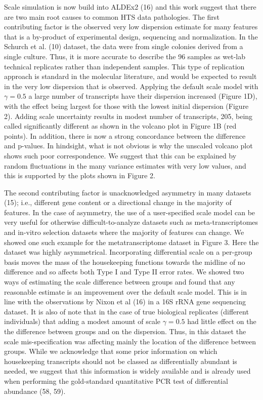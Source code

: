 \documentclass[
]{article}
\begin{document}
Scale simulation is now build into ALDEx2 (16) and this work suggest
that there are two main root causes to common HTS data pathologies. The
first contributing factor is the observed very low dispersion estimate
for many features that is a by-product of experimental design,
sequencing and normalization. In the Schurch et al. (10) dataset, the
data were from single colonies derived from a single culture. Thus, it
is more accurate to describe the 96 samples as wet-lab technical
replicates rather than independent samples. This type of replication
approach is standard in the molecular literature, and would be expected
to result in the very low dispersion that is observed. Applying the
default scale model with \(\gamma=0.5\) a large number of transcripts
have their dispersion increased (Figure 1D), with the effect being
largest for those with the lowest initial dispersion (Figure 2). Adding
scale uncertainty results in modest number of transcripts, 205, being
called significantly different as shown in the volcano plot in Figure 1B
(red points). In addition, there is now a strong concordance between the
difference and p-values. In hindsight, what is not obvious is why the
unscaled volcano plot shows such poor correspondence. We suggest that
this can be explained by random fluctuations in the many variance
estimates with very low values, and this is supported by the plots shown
in Figure 2.

The second contributing factor is unacknowledged asymmetry in many
datasets (15); i.e., different gene content or a directional change in
the majority of features. In the case of asymmetry, the use of a
user-specified scale model can be very useful for otherwise
difficult-to-analyze datasets such as meta-transcriptomes and in-vitro
selection datasets where the majority of features can change. We showed
one such example for the metatranscriptome dataset in Figure 3. Here the
dataset was highly asymmetrical. Incorporating differential scale on a
per-group basis moves the mass of the housekeeping functions towards the
midline of no difference and so affects both Type I and Type II error
rates. We showed two ways of estimating the scale difference between
groups and found that any reasonable estimate is an improvement over the
default scale model. This is in line with the observations by Nixon et
al (16) in a 16S rRNA gene sequencing dataset. It is also of note that
in the case of true biological replicates (different individuals) that
adding a modest amount of scale \(\gamma=0.5\) had little effect on the
the difference between groups and on the dispersion. Thus, in this
dataset the scale mis-specification was affecting mainly the location of
the difference between groups. While we acknowledge that some prior
information on which housekeeping transcripts should not be classed as
differentially abundant is needed, we suggest that this information is
widely available and is already used when performing the gold-standard
quantitative PCR test of differential abundance (58, 59).
\end{document}
